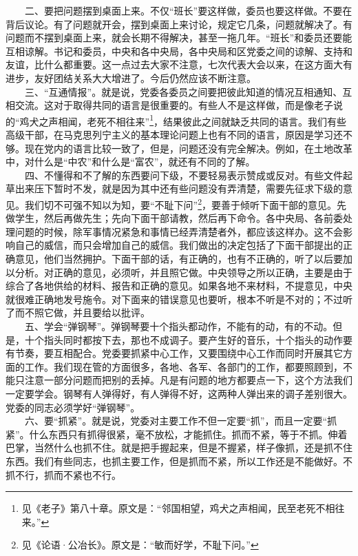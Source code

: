 \documentclass[cn,11pt,chinese]{elegantbook}
\begin{document}
　　二、要把问题摆到桌面上来。不仅“班长”要这样做，委员也要这样做。不要在背后议论。有了问题就开会，摆到桌面上来讨论，规定它几条，问题就解决了。有问题而不摆到桌面上来，就会长期不得解决，甚至一拖几年。“班长”和委员还要能互相谅解。书记和委员，中央和各中央局，各中央局和区党委之间的谅解、支持和友谊，比什么都重要。这一点过去大家不注意，七次代表大会以来，在这方面大有进步，友好团结关系大大增进了。今后仍然应该不断注意。\\
　　三、“互通情报”。就是说，党委各委员之间要把彼此知道的情况互相通知、互相交流。这对于取得共同的语言是很重要的。有些人不是这样做，而是像老子说的“鸡犬之声相闻，老死不相往来”\footnote[1]{ 见《老子》第八十章。原文是：“邻国相望，鸡犬之声相闻，民至老死不相往来。”}，结果彼此之间就缺乏共同的语言。我们有些高级干部，在马克思列宁主义的基本理论问题上也有不同的语言，原因是学习还不够。现在党内的语言比较一致了，但是，问题还没有完全解决。例如，在土地改革中，对什么是“中农”和什么是“富农”，就还有不同的了解。\\
　　四、不懂得和不了解的东西要问下级，不要轻易表示赞成或反对。有些文件起草出来压下暂时不发，就是因为其中还有些问题没有弄清楚，需要先征求下级的意见。我们切不可强不知以为知，要“不耻下问”\footnote[2]{ 见《论语·公冶长》。原文是：“敏而好学，不耻下问。”}，要善于倾听下面干部的意见。先做学生，然后再做先生；先向下面干部请教，然后再下命令。各中央局、各前委处理问题的时候，除军事情况紧急和事情已经弄清楚者外，都应该这样办。这不会影响自己的威信，而只会增加自己的威信。我们做出的决定包括了下面干部提出的正确意见，他们当然拥护。下面干部的话，有正确的，也有不正确的，听了以后要加以分析。对正确的意见，必须听，并且照它做。中央领导之所以正确，主要是由于综合了各地供给的材料、报告和正确的意见。如果各地不来材料，不提意见，中央就很难正确地发号施令。对下面来的错误意见也要听，根本不听是不对的；不过听了而不照它做，并且要给以批评。\\
　　五、学会“弹钢琴”。弹钢琴要十个指头都动作，不能有的动，有的不动。但是，十个指头同时都按下去，那也不成调子。要产生好的音乐，十个指头的动作要有节奏，要互相配合。党委要抓紧中心工作，又要围绕中心工作而同时开展其它方面的工作。我们现在管的方面很多，各地、各军、各部门的工作，都要照顾到，不能只注意一部分问题而把别的丢掉。凡是有问题的地方都要点一下，这个方法我们一定要学会。钢琴有人弹得好，有人弹得不好，这两种人弹出来的调子差别很大。党委的同志必须学好“弹钢琴”。\\
　　六、要“抓紧”。就是说，党委对主要工作不但一定要“抓”，而且一定要“抓紧”。什么东西只有抓得很紧，毫不放松，才能抓住。抓而不紧，等于不抓。伸着巴掌，当然什么也抓不住。就是把手握起来，但是不握紧，样子像抓，还是抓不住东西。我们有些同志，也抓主要工作，但是抓而不紧，所以工作还是不能做好。不抓不行，抓而不紧也不行。\\
\end{document}

